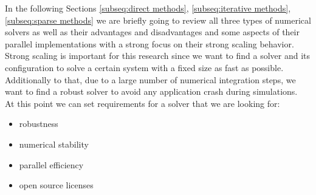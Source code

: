 In the following Sections \ref{subseq:direct methods}, \ref{subseq:iterative methods}, \ref{subseq:sparse methods} we are briefly going to review all three types of numerical solvers as well as their advantages and disadvantages and some aspects of their parallel implementations with a strong focus on their strong scaling behavior. Strong scaling is important for this research since we want to find a solver and its configuration to solve a certain system with a fixed size as fast as possible. Additionally to that, due to a large number of numerical integration steps, we want to find a robust solver to avoid any application crash during simulations.\\

At this point we can set requirements for a solver that we are looking for:\\

\begin{itemize}
	\item robustness
	\item numerical stability
	\item parallel efficiency
	\item open source licenses
\end{itemize}


